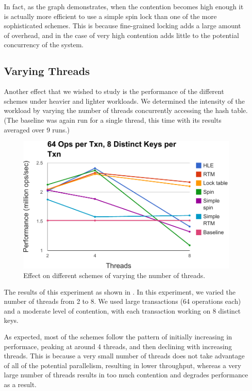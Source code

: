 In fact, as the graph demonstrates, when the contention becomes high enough it
is actually more efficient to use a simple spin lock than one of the more
sophisticated schemes. This is because fine-grained locking adds a large amount
of overhead, and in the case of very high contention adds little to the
potential concurrency of the system.

\subsection{Varying Threads}

Another effect that we wished to study is the performance of the different
schemes under heavier and lighter workloads. We determined the intensity of the
workload by varying the number of threads concurrently accessing the hash
table. (The baseline was again run for a single thread, this time with its
results averaged over 9 runs.)

\begin{figure}[h!]
  \centering
  \includegraphics[scale=0.575]{figure/threads.pdf}
  \caption{Effect on different schemes of varying the number of threads.}
  \label{fig:threads} 
\end{figure}

The results of this experiment as shown in . In this
experiment, we varied the number of threads from 2 to 8. We used large
transactions (64 operations each) and a moderate level of contention, with each
transaction working on 8 distinct keys.

As expected, most of the schemes follow the pattern of initially increasing in
performace, peaking at around 4 threads, and then declining with increasing
threads. This is because a very small number of threads does not take advantage
of all of the potential parallelism, resulting in lower throughput, whereas a
very large number of threads results in too much contention and degrades
performance as a result.

